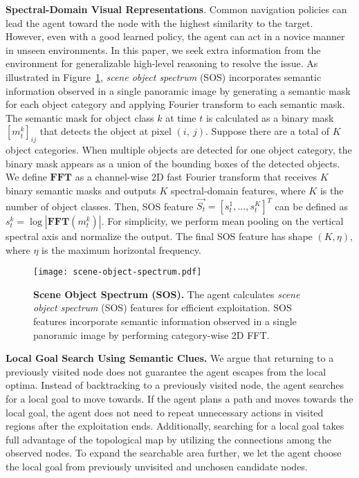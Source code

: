 \documentclass[10pt,twocolumn,letterpaper]{article}
\begin{document}
\noindent\textbf{Spectral-Domain Visual Representations}.
Common navigation policies can lead the agent toward the node with the highest similarity to the target.
However, even with a good learned policy, the agent can act in a novice manner in unseen environments.
In this paper, we seek extra information from the environment for generalizable high-level reasoning to resolve the issue. As illustrated in Figure~\ref{fig:scene-object-spectrum},
\textit{scene object spectrum} (SOS) incorporates semantic information observed in a single panoramic image by
generating a semantic mask for each object category and applying Fourier transform to each semantic mask. The semantic mask for object class $k$ at time $t$ is calculated as a binary mask $[m^k_t]_{ij}$ that detects the object at pixel $(i,\ j)$.
Suppose there are a total of $K$ object categories. When multiple objects are detected for one object category, the binary mask appears as a union of the bounding boxes of the detected objects. We define $\mathbf{FFT}$ as a channel-wise 2D fast Fourier transform
that receives $K$ binary semantic masks and outputs $K$ spectral-domain features, where $K$ is the number of object classes. 
Then, SOS feature $\vec{S_t}=[s^1_t, ..., s^K_t]^T$ can be defined as $s^k_t =\log|\mathbf{FFT}(m^k_t)|$. For simplicity, we perform mean pooling on the vertical spectral axis and normalize the output. The final SOS feature has shape $(K, \eta)$, where $\eta$ is the maximum horizontal frequency.

\begin{figure}[t!]{\centering\texttt{[image: scene-object-spectrum.pdf]}}\centering
\caption{\protect\renewcommand{\baselinestretch}{0.9}\small{{\textbf{Scene Object Spectrum (SOS).} The agent calculates \textit{scene object spectrum} (SOS) features for efficient exploitation. SOS features incorporate semantic information observed in a single panoramic image by performing category-wise 2D FFT.}\vspace{-0.4cm} }} \label{fig:scene-object-spectrum}\end{figure}

\noindent\textbf{Local Goal Search Using Semantic Clues.}\label{paragraph:local-goal-search-with-semantic-clues}
\font=2.3pt
We argue that returning to a previously visited node does not guarantee the agent escapes from the local optima. Instead of backtracking to a previously visited node, the agent searches for a local goal to move towards. If the agent plans a path and moves towards the local goal, the agent does not need to repeat unnecessary actions in visited regions after the exploitation ends. Additionally, searching for a local goal takes full advantage of the topological map by utilizing the connections among the observed nodes. To expand the searchable area further, we let the agent choose the local goal from previously unvisited and unchosen candidate nodes.
\font=2.5pt
\end{document}
